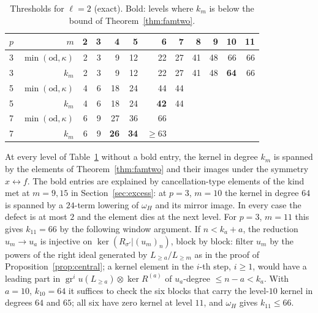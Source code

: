 \documentclass[11pt]{amsart}
\theoremstyle{definition}
\newcommand{\gr}{\operatorname{gr}}
\begin{document}
\begin{table}[h]
\centering
\begin{tabular}{rrrrrrrrrrrr}
\toprule
$p$ & $m$ & 2 & 3 & 4 & 5 & 6 & 7 & 8 & 9 & 10 & 11\\
\midrule
3 & $\min(\mathrm{od},\kappa)$ & 2 & 3 & 9 & 12 & 22 & 27 & 41 & 48 & 66 & 66\\
3 & $k_m$ & 2 & 3 & 9 & 12 & 22 & 27 & 41 & 48 & \textbf{64} & 66\\
5 & $\min(\mathrm{od},\kappa)$ & 4 & 6 & 18 & 24 & 44 & 44 & & & & \\
5 & $k_m$ & 4 & 6 & 18 & 24 & \textbf{42} & 44 & & & & \\
7 & $\min(\mathrm{od},\kappa)$ & 6 & 9 & 27 & 36 & 66 & & & & & \\
7 & $k_m$ & 6 & 9 & \textbf{26} & \textbf{34} & $\ge63$ & & & & & \\
\bottomrule
\end{tabular}
\caption{Thresholds for $\ell=2$ (exact). Bold: levels where $k_m$ is below the bound of Theorem~\ref{thm:famtwo}.}
\label{tab:famtwo}
\end{table}

At every level of Table~\ref{tab:famtwo} without a bold entry, the kernel in degree $k_m$ is spanned by the elements of
Theorem~\ref{thm:famtwo} and their images under the symmetry $x\leftrightarrow f$. The bold entries are explained by
cancellation-type elements of the kind met at $m=9,15$ in Section~\ref{sec:excess}: at $p=3$, $m=10$ the kernel in degree
$64$ is spanned by a $24$-term lowering of $\omega_H$ and its mirror image. In every case the defect is at most $2$ and the
element dies at the next level. For $p=3$, $m=11$ this gives $k_{11}=66$ by the following window argument. If $n<k_a+a$,
the reduction $u_m\to u_a$ is injective on $\ker(R_{\sigma'}|(u_m)_n)$, block by block: filter $u_m$ by the powers of the
right ideal generated by $L_{\ge a}/L_{\ge m}$ as in the proof of Proposition~\ref{prop:central}; a kernel element in the
$i$-th step, $i\ge1$, would have a leading part in $\gr^iu(L_{\ge a})\otimes\ker R^{(a)}$ of $u_a$-degree $\le n-a<k_a$. With
$a=10$, $k_{10}=64$ it suffices to check the six blocks that carry the level-$10$ kernel in degrees $64$ and $65$; all six
have zero kernel at level $11$, and $\omega_H$ gives $k_{11}\le66$.
\end{document}
